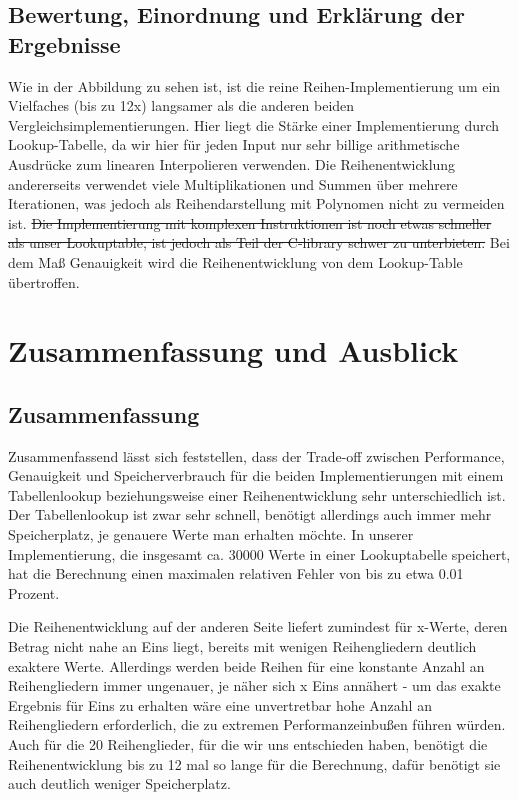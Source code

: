 \documentclass[course=erap] {aspdoc}
\begin{document}
    \subsection{Bewertung, Einordnung und Erklärung der Ergebnisse}
    Wie in der Abbildung zu sehen ist, ist die reine Reihen-Implementierung um ein Vielfaches (bis zu 12x) langsamer als die anderen
    beiden Vergleichsimplementierungen.
    Hier liegt die Stärke einer Implementierung durch Lookup-Tabelle, da wir hier für jeden
    Input nur sehr billige arithmetische Ausdrücke zum linearen Interpolieren verwenden.
    Die Reihenentwicklung andererseits verwendet viele Multiplikationen und Summen über mehrere Iterationen, was jedoch als Reihendarstellung mit Polynomen nicht zu vermeiden ist.
    \sout{Die Implementierung mit komplexen Instruktionen ist noch etwas schneller als unser Lookuptable, ist jedoch als Teil der
    C-library schwer zu unterbieten.} Bei dem Maß Genauigkeit wird die Reihenentwicklung von dem Lookup-Table übertroffen.

    \section{Zusammenfassung und Ausblick}
    \subsection{Zusammenfassung}
    Zusammenfassend lässt sich feststellen, dass der Trade-off zwischen Performance, Genauigkeit und Speicherverbrauch für die beiden Implementierungen mit einem Tabellenlookup beziehungsweise einer Reihenentwicklung sehr unterschiedlich ist.
    Der Tabellenlookup ist zwar sehr schnell, benötigt allerdings auch immer mehr Speicherplatz, je genauere Werte man erhalten möchte.
    In unserer Implementierung, die insgesamt ca. 30000 Werte in einer Lookuptabelle speichert, hat die Berechnung einen maximalen relativen Fehler von bis zu etwa 0.01 Prozent.

    Die Reihenentwicklung auf der anderen Seite liefert zumindest für x-Werte, deren Betrag nicht nahe an Eins liegt, bereits mit wenigen Reihengliedern deutlich exaktere Werte.
    Allerdings werden beide Reihen für eine konstante Anzahl an Reihengliedern immer ungenauer, je näher sich x Eins annähert - um das exakte Ergebnis für Eins zu erhalten wäre eine unvertretbar hohe Anzahl an Reihengliedern erforderlich, die zu extremen Performanzeinbußen führen würden.
    Auch für die 20 Reihenglieder, für die wir uns entschieden haben, benötigt die Reihenentwicklung bis zu 12 mal so lange für die Berechnung, dafür benötigt sie auch deutlich weniger Speicherplatz.
\end{document}
